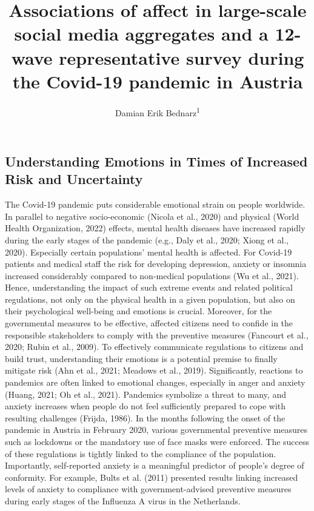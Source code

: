 \documentclass[
  english,
  jou,floatsintext]{apa7}
\title{Associations of affect in large-scale social media aggregates and a 12-wave representative survey during the Covid-19 pandemic in Austria}
\author{Damian Erik Bednarz\textsuperscript{1}}
\date{}
\affiliation{\vspace{0.5cm}\textsuperscript{1} University of Vienna}
\begin{document}
\maketitle

\hypertarget{understanding-emotions-in-times-of-increased-risk-and-uncertainty}{%
\subsection{Understanding Emotions in Times of Increased Risk and Uncertainty}\label{understanding-emotions-in-times-of-increased-risk-and-uncertainty}}

The Covid-19 pandemic puts considerable emotional strain on people worldwide. In parallel to negative socio-economic (Nicola et al., 2020) and physical (World Health Organization, 2022) effects, mental health diseases have increased rapidly during the early stages of the pandemic (e.g., Daly et al., 2020; Xiong et al., 2020). Especially certain populations' mental health is affected. For Covid-19 patients and medical staff the risk for developing depression, anxiety or insomnia increased considerably compared to non-medical populations (Wu et al., 2021). Hence, understanding the impact of such extreme events and related political regulations, not only on the physical health in a given population, but also on their psychological well-being and emotions is crucial. Moreover, for the governmental measures to be effective, affected citizens need to confide in the responsible stakeholders to comply with the preventive measures (Fancourt et al., 2020; Rubin et al., 2009). To effectively communicate regulations to citizens and build trust, understanding their emotions is a potential premise to finally mitigate risk (Ahn et al., 2021; Meadows et al., 2019).
Significantly, reactions to pandemics are often linked to emotional changes, especially in anger and anxiety (Huang, 2021; Oh et al., 2021). Pandemics symbolize a threat to many, and anxiety increases when people do not feel sufficiently prepared to cope with resulting challenges (Frijda, 1986). In the months following the onset of the pandemic in Austria in February 2020, various governmental preventive measures such as lockdowns or the mandatory use of face masks were enforced. The success of these regulations is tightly linked to the compliance of the population. Importantly, self-reported anxiety is a meaningful predictor of people's degree of conformity. For example, Bults et al. (2011) presented results linking increased levels of anxiety to compliance with government-advised preventive measures during early stages of the Influenza A virus in the Netherlands.
\end{document}
